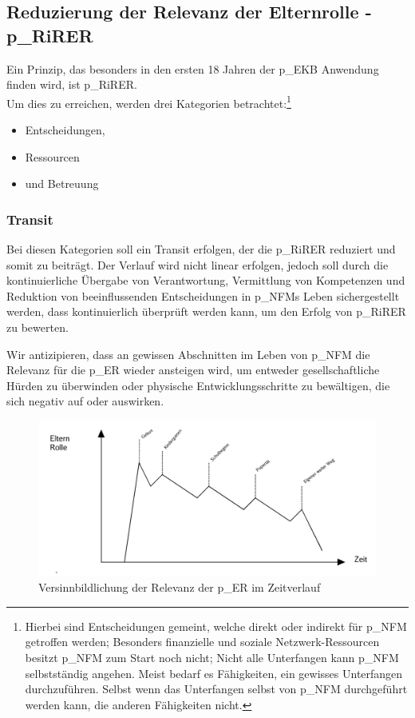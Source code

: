 \subsection{Reduzierung der Relevanz der Elternrolle - \gls{p_RiRER}}

Ein Prinzip, das besonders in den ersten 18 Jahren der \gls{p_EKB} Anwendung finden wird, ist \gls{p_RiRER}.\\

Um dies zu erreichen, werden drei Kategorien betrachtet:\footnote{
	Hierbei sind Entscheidungen gemeint, welche direkt oder indirekt für \gls{p_NFM} getroffen werden; Besonders finanzielle und soziale Netzwerk-Ressourcen besitzt \gls{p_NFM} zum Start noch nicht; Nicht alle Unterfangen kann \gls{p_NFM} selbstständig angehen. Meist bedarf es Fähigkeiten, ein gewisses Unterfangen durchzuführen. Selbst wenn das Unterfangen selbst von \gls{p_NFM} durchgeführt werden kann, die anderen Fähigkeiten nicht.
} 
\begin{itemize}
	\item Entscheidungen,
	\item Ressourcen
	\item und Betreuung
\end{itemize}

\subsubsection{Transit}
Bei diesen Kategorien soll ein Transit erfolgen, der die \gls{p_RiRER} reduziert und somit zu  beiträgt. Der Verlauf wird nicht linear erfolgen, jedoch soll durch die kontinuierliche Übergabe von Verantwortung, Vermittlung von Kompetenzen und Reduktion von beeinflussenden Entscheidungen in \gls{p_NFM}s Leben sichergestellt werden, dass  kontinuierlich überprüft werden kann, um den Erfolg von \gls{p_RiRER} zu bewerten. 

Wir antizipieren, dass an gewissen Abschnitten im Leben von \gls{p_NFM} die Relevanz für die \gls{p_ER} wieder ansteigen wird, um entweder gesellschaftliche Hürden zu überwinden oder physische Entwicklungsschritte zu bewältigen, die sich negativ auf  oder \NFMOTwo auswirken.

\begin{figure}[H]
	\centering
	\includegraphics[scale = 0.3]{attachment/chapter_OWN/Scc005.png}
	\caption{Versinnbildlichung der Relevanz der \gls{p_ER} im Zeitverlauf}
\end{figure} 

